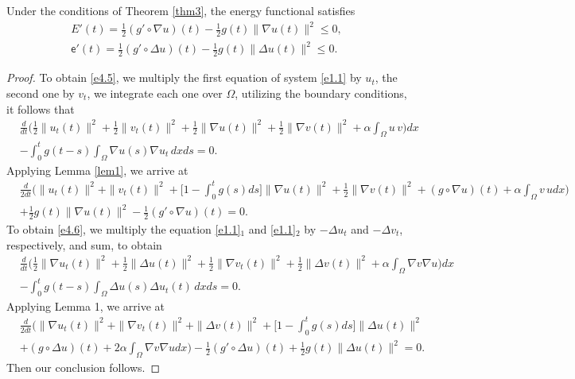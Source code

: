 \begin{lemma} \label{lem5}
Under the conditions of Theorem \ref{thm3}, the energy functional satisfies
\begin{gather}
E'(t) = \frac{1}{2} (g' \circ \nabla u)(t) - \frac{1}{2} g(t) \| \nabla u(t) \|^2
 \leq 0, \label{e4.5}\\
\mathsf{e}'(t)= \frac{1}{2}(g' \circ \Delta u)(t)-\frac{1}{2} g(t) \| \Delta u(t) \|^2
\leq 0.\label{e4.6}
\end{gather}
\end{lemma}

\begin{proof}
To obtain \eqref{e4.5}, we multiply the first equation of system \eqref{e1.1} by
$u_{t}$, the second one by $v_{t}$, we integrate each one over $\Omega$, utilizing
the boundary conditions, it follows that
\begin{align*}
&\frac{d}{dt} \Big( \frac{1}{2} \| u_{t}(t) \|^2 +\frac{1}{2} \| v_{t}(t) \|^2
+\frac{1}{2} \| \nabla u(t) \|^2 +\frac{1}{2} \| \nabla v(t) \|^2
 + \alpha \int_{\Omega} u\,v \Big) dx\\
&- \int_0^t g(t-s) \int_{\Omega} \nabla u(s) \nabla u_{t} \, dx ds =0.
\end{align*}
Applying Lemma \ref{lem1}, we arrive at
 \begin{align*}
&\frac{d}{2dt} \Big( \| u_{t}(t) \|^2 +\| v_{t}(t) \|^2
 + \Big[ 1-\int_0^t g(s) ds \Big] \| \nabla u(t) \|^2
 +\frac{1}{2} \| \nabla v(t) \|^2+ (g\circ \nabla u)(t)
 +\alpha \int_{\Omega} v \, u dx \Big) \\
& +\frac{1}{2} g(t)\parallel \nabla u(t) \parallel^2
- \frac{1}{2}( g'\circ\nabla u) (t) =0.
 \end{align*}
 To obtain \eqref{e4.6}, we multiply the equation \eqref{e1.1}$_1$ and
 \eqref{e1.1}$_2$ by $-\Delta u_t$ and $-\Delta v_t$, respectively,
and sum, to obtain
 \begin{align*}
&\frac{d}{dt}  \Big( \frac{1}{2} \| \nabla u_{t}(t) \|^2 + \frac{1}{2} \| \Delta u(t) \|^2 + \frac{1}{2}\| \nabla v_{t}(t) \|^2+ \frac{1}{2} \| \Delta v(t) \|^2 + \alpha \int_{\Omega} \nabla v \nabla u \Big) dx \\ 
& - \int_0^t g(t-s) \int_{\Omega} \Delta u(s) \Delta u_{t}(t) \, dx ds =0.
 \end{align*}
 Applying Lemma 1, we arrive at
\begin{align*}
&\frac{d}{2dt} \Big( \| \nabla u_t(t) \|^2+\| \nabla v_t(t) \|^2
+ \| \Delta v(t) \|^2 +\Big[ 1- \int_0^t g(s) ds \Big] \| \Delta u(t) \|^2 \\
& + (g \circ \Delta u)(t)+ 2 \alpha \int_{\Omega}\nabla v \nabla u dx\Big)
-\frac{1}{2}(g' \circ \Delta u)(t)+\frac{1}{2} g(t) \| \Delta u(t) \|^2=0.
\end{align*}
Then our conclusion follows.
\end{proof}

